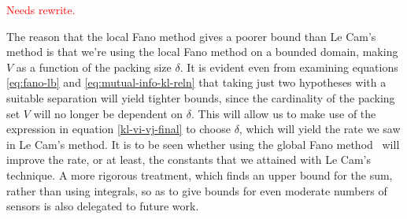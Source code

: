 \documentclass[conference]{IEEEtran}
\begin{document}
\textcolor{red}{Needs rewrite.}

The reason that the local Fano method gives a poorer bound than Le Cam's method
is that we're using the local Fano method on a bounded domain, making $V$ as a
function of the packing size $\delta$.  It is evident even from examining
equations \eqref{eq:fano-lb} and \eqref{eq:mutual-info-kl-reln} that taking
just two hypotheses with a suitable separation will yield tighter bounds, since
the cardinality of the packing set $V$ will no longer be dependent on $\delta$.
This will allow us to make use of the expression in equation
\eqref{kl-vi-vj-final} to choose $\delta$, which will yield the rate we saw in
Le Cam's method. It is to be seen whether using the global Fano
method~\cite{Duchi2015Information} will improve the rate, or at least, the
constants that we attained with Le Cam's technique. A more rigorous treatment,
which finds an upper bound for the sum, rather than using integrals, so as to
give bounds for even moderate numbers of sensors is also delegated to future
work.




\end{document}
